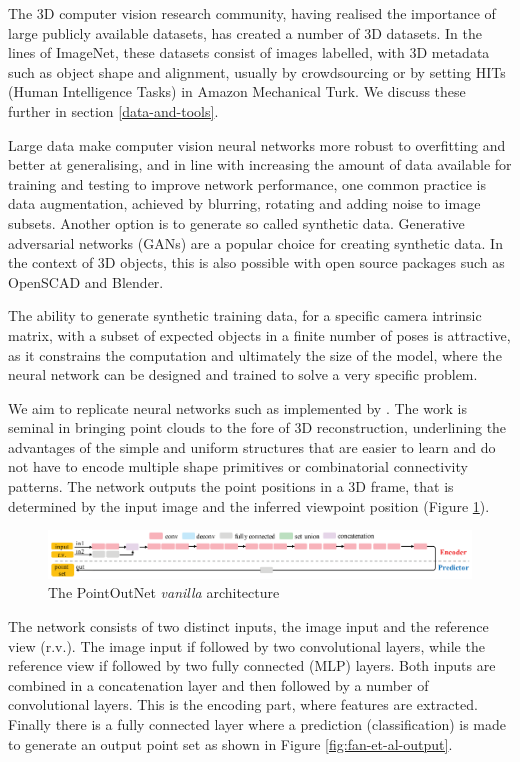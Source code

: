 The 3D computer vision research community, having realised the importance of large publicly available datasets, has created a number of 3D datasets. In the lines of ImageNet, these datasets consist of images labelled, with 3D metadata such as object shape and alignment, usually by crowdsourcing or by setting HITs (Human Intelligence Tasks) in Amazon Mechanical Turk. We discuss these further in section \ref{data-and-tools}.

Large data make computer vision neural networks more robust to overfitting and better at generalising, and in line with increasing the amount of data available for training and testing to improve network performance, one common practice is data augmentation, achieved by blurring, rotating and adding noise to image subsets. Another option is to generate so called synthetic data. Generative adversarial networks (GANs) are a popular choice for creating synthetic data. In the context of 3D objects, this is also possible with open source packages such as OpenSCAD and Blender.  

The ability to generate synthetic training data, for a specific camera intrinsic matrix, with a subset of expected objects in a finite number of poses is attractive, as it constrains the computation and ultimately the size of the model, where the neural network can be designed and trained to solve a very specific problem.

We aim to replicate neural networks such as implemented by  \cite{fan2016point}. The work is seminal in bringing point clouds to the fore of 3D reconstruction, underlining the advantages of the simple and uniform structures that are easier to learn and do not have to encode multiple shape primitives or combinatorial connectivity patterns. The network outputs the point positions in a 3D frame, that is determined by the input image and the inferred viewpoint position (Figure \ref{fig:fan-et-al-vanilla}). 

\begin{figure}[ht]
 \centering 
 \includegraphics[width=\columnwidth]{figures/fan-et-al-vanilla.png}
 \caption{The PointOutNet \textit{vanilla} architecture}
 \label{fig:fan-et-al-vanilla}
\end{figure}

The network consists of two distinct inputs, the image input and the reference view (r.v.). The image input if followed by two convolutional layers, while the reference view if followed by two fully connected (MLP) layers. Both inputs are combined in a concatenation layer and then followed by a number of convolutional layers. This is the encoding part, where features are extracted. Finally there is a fully connected layer where a prediction (classification) is made to generate an output point set as shown in Figure \ref{fig:fan-et-al-output}. 

